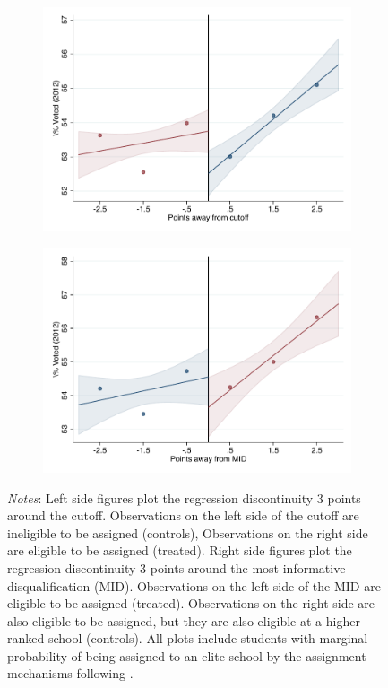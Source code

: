 \documentclass[oneside,11pt]{article}
\begin{document}
\begin{figure}[H]
\begin{center}
    \begin{subfigure}{0.475\textwidth}
        \centering
        \includegraphics[width=\textwidth]{04_Figures/rd_plot_tau_Voto_Marcado_2012_UNAM3.pdf}
    \end{subfigure}
    \begin{subfigure}{0.475\textwidth}
        \centering
        \includegraphics[width=\textwidth]{04_Figures/rd_plot_mid_Voto_Marcado_2012_UNAM3.pdf}
    \end{subfigure}
    \end{center}
    
\footnotesize
\textit{Notes}: Left side figures plot the regression discontinuity 3 points around the cutoff. Observations on the left side of the cutoff are ineligible to be assigned (controls), Observations on the right side are eligible to be assigned (treated). Right side figures plot the regression discontinuity 3 points around the most informative disqualification (MID). Observations on the left side of the MID are eligible to be assigned (treated). Observations on the right side are also eligible to be assigned, but they are also eligible at a higher ranked school (controls). All plots include students with marginal probability of being assigned to an elite school by the assignment mechanisms following \citet{abdulkadirouglu2022breaking}. 
\end{figure}
\end{document}
